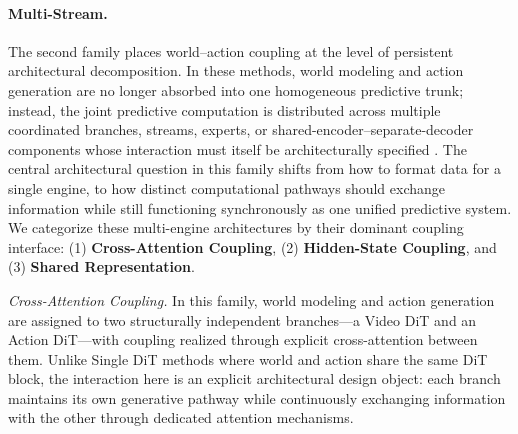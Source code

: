 \paragraph{\textbf{Multi-Stream.}} 
\label{sec:multi-dit}
The second family places world--action coupling at the level of persistent architectural decomposition.  In these methods, world modeling and action generation are no longer absorbed into one homogeneous predictive trunk; instead, the joint predictive computation is distributed across multiple coordinated branches, streams, experts, or shared-encoder--separate-decoder components whose interaction must itself be architecturally specified \cite{Motus,LingBotVA,LDA1B,CoVAR,AdaWorldPolicy,Act2Goal,DUST,DiT4DiT,UVA,PhysGen,AIM,MotuBrain,FastWAM,WAV,DexWorldModel}. The central architectural question in this family shifts from how to format data for a single engine, to how distinct computational pathways should exchange information while still functioning synchronously as one unified predictive system. We categorize these multi-engine architectures by their dominant coupling interface: (1) \textbf{Cross-Attention Coupling}, (2) \textbf{Hidden-State Coupling}, and (3) \textbf{Shared Representation}.


\textcolor{openmossblue}{\textit{Cross-Attention Coupling.}} In this family, world modeling and action generation are assigned to two structurally independent branches—a Video DiT and an Action DiT—with coupling realized through explicit cross-attention between them. Unlike Single DiT methods where world and action share the same DiT block, the interaction here is an explicit architectural design object: each branch maintains its own generative pathway while continuously exchanging information with the other through dedicated attention mechanisms.

